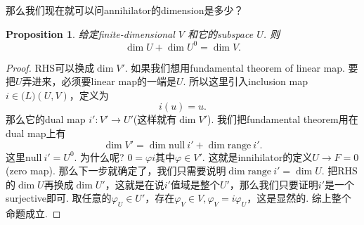 \documentclass{article}
\newtheorem{proposition}[theorem]{Proposition}
\newcommand*{\xfunc}[4]{{#2}\colon{#3}{#1}{#4}}
\newcommand*{\func}[3]{\xfunc{\to}{#1}{#2}{#3}}
\newcommand\nul[1]{\text{null}\ #1}
\newcommand\range[1]{\text{range}\ #1}
\begin{document}
{\color{red} 那么我们现在就可以问annihilator的dimension是多少}？ 

\begin{proposition}
\rm 给定finite-dimensional $V$ 和它的subspace $U$. 则
$$
\dim U + \dim U^0 = \dim V.
$$
\end{proposition}

\begin{proof}
RHS可以换成$\dim V'$. 如果我们想用fundamental theorem of linear map. 要把$U$弄进来，必须要linear map的一端是$U$. 所以这里引入inclusion map $i \in \mathcal(L)(U,V)$，定义为
$$
i(u) = u.
$$ 
那么它的dual map $\func{i'}{V'}{U'}$(这样就有$\dim V'$). 我们把fundamental theorem用在dual map上有
$$
\dim V' = \dim\nul{i'} + \dim\range{i'}. 
$$
这里$\nul{i'} = U^0$. 为什么呢? $0 = \varphi i$其中$\varphi \in V'$. 这就是innihilator的定义$U \rightarrow F = 0$(zero map). 那么下一步就确定了，我们只需要说明$\dim \range{i'} = \dim U$. 把RHS的$\dim U$再换成$\dim U'$，这就是在说$i'$值域是整个$U'$，那么我们只要证明$i'$是一个surjective即可. 取任意的$\varphi_U \in U'$，存在$\varphi_V \in V, \varphi_V = i\varphi_U$，这是显然的. 综上整个命题成立.
\end{proof}
\end{document}
